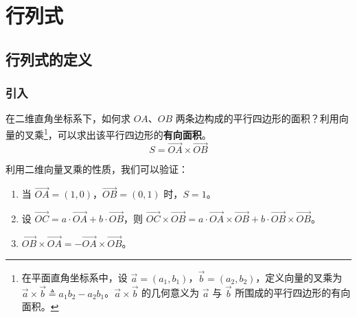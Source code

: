 
\chapter{行列式}

\section{行列式的定义}

\subsection{引入}

在二维直角坐标系下，如何求 $OA$、$OB$ 两条边构成的平行四边形的面积？利用向量的叉乘\footnote{在平面直角坐标系中，设 $\vec a = (a_1, b_1)$，$\vec b = (a_2, b_2)$，定义向量的叉乘为 $\vec a \times \vec b \triangleq a_1 b_2 - a_2 b_1$。$\vec a \times \vec b$ 的几何意义为 $\vec a$ 与 $\vec b$ 所围成的平行四边形的有向面积。}，可以求出该平行四边形的\textbf{有向面积}。
$$
S = \overset{\longrightarrow}{OA} \times \overset{\longrightarrow}{OB}
$$

利用二维向量叉乘的性质，我们可以验证：
\begin{enumerate}
	\item 当 $\overset{\longrightarrow}{OA} = (1, 0)$，$\overset{\longrightarrow}{OB} = (0, 1)$ 时，$S = 1$。
	\item 设 $\overset{\longrightarrow}{OC} = a \cdot \overset{\longrightarrow}{OA} + b \cdot \overset{\longrightarrow}{OB}$，则 $\overset{\longrightarrow}{OC} \times \overset{\longrightarrow}{OB} = a \cdot \overset{\longrightarrow}{OA} \times \overset{\longrightarrow}{OB} + b \cdot \overset{\longrightarrow}{OB} \times \overset{\longrightarrow}{OB}$。
	\item $\overset{\longrightarrow}{OB} \times \overset{\longrightarrow}{OA} = -\overset{\longrightarrow}{OA} \times \overset{\longrightarrow}{OB}$。
\end{enumerate}

